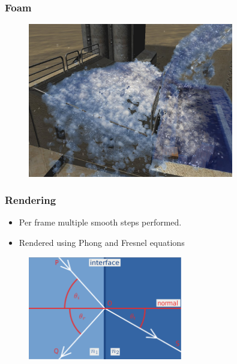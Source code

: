\documentclass{beamer}
\begin{document}
	\begin{frame}[t]\frametitle{Foam}
	    \begin{figure}
			\centering
			\includegraphics[width=0.8\textwidth]{foam.png}
		\end{figure}
	
	\end{frame}
	\begin{frame}[t]\frametitle{Rendering}
	    \begin{itemize}
	    	\item Per frame multiple smooth steps performed.
	    	\item Rendered using Phong and Fresnel equations
	    \end{itemize}
	    \begin{figure}
			\centering
			\includegraphics[width=0.6\textwidth]{Fresnel.eps}
		\end{figure}
	
	\end{frame}
\end{document}

